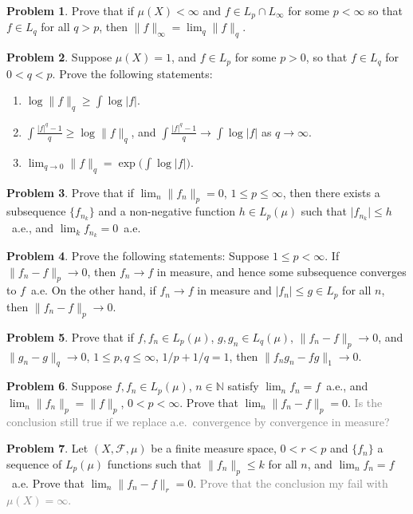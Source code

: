 \documentclass[12pt,reqno]{amsart}
\def\field#1{\mathbb{#1}}
\def\abs#1{\lvert {#1} \rvert}
\def\Lpnorm#1#2{\lVert {#1} \rVert_{#2}}
\theoremstyle{definition}
\newtheorem{problem}{Problem}
\theoremstyle{remark}
\begin{document}
\begin{problem}
  Prove that if $\mu(X) < \infty$ and $f \in L_p \cap L_\infty$ for
  some $p<\infty$ so that $f \in L_q$ for all $q>p$, then
  $\Lpnorm{f}{\infty} = \lim_q \Lpnorm{f}{q}$.
\end{problem}
\begin{problem}
  Suppose $\mu(X)=1$, and $f \in L_p$ for some $p>0$, so that $f \in
  L_q$ for $0<q<p$.  Prove the following statements:
  \begin{enumerate}
  \item $\log \Lpnorm{f}{q} \geq \int \log \abs{f}$.
  \item $\int \frac{\abs{f}^q - 1}{q} \geq \log \Lpnorm{f}{q}$, and
    $\int \frac{\abs{f}^q - 1}{q} \to \int \log \abs{f}$ as $q \to
    \infty$.
  \item $\lim_{q \to 0} \Lpnorm{f}{q} = \exp \big( \int \log \abs{f}
  \big)$.
  \end{enumerate}
\end{problem}

\begin{problem}
  Prove that if $\lim_n \Lpnorm{f_n}{p} = 0$, $1 \leq p \leq \infty$,
  then there exists a subsequence $\{ f_{n_k} \}$ and a non-negative
  function $h \in L_p(\mu)$ such that $\abs{f_{n_k}} \leq h$~a.e., and
  $\lim_k f_{n_k} = 0$~a.e.
\end{problem}
\begin{problem}
  Prove the following statements: Suppose $1 \leq p < \infty$.  If
  $\Lpnorm{f_n - f}{p} \to 0$, then $f_n \to f$ in measure, and hence
  some subsequence converges to $f$~a.e.  On the other hand, if $f_n
  \to f$ in measure and $\abs{f_n} \leq g \in L_p$ for all $n$, then
  $\Lpnorm{f_n - f}{p} \to 0$.
\end{problem}
\begin{problem}
  Prove that if $f, f_n \in L_p(\mu)$, $g,g_n \in L_q(\mu)$,
  $\Lpnorm{f_n - f}{p} \to 0$, and $\Lpnorm{g_n - g}{q} \to 0$, $1\leq
  p,q \leq \infty$, $1/p + 1/q =1$, then $\Lpnorm{f_n g_n - fg}{1} \to
  0$.
\end{problem}
\begin{problem}
  Suppose $f, f_n \in L_p(\mu)$, $n \in \field{N}$ satisfy $\lim_n f_n
  = f$~a.e., and $\lim_n \Lpnorm{f_n}{p} = \Lpnorm{f}{p}$,
  $0<p<\infty$.  Prove that $\lim_n \Lpnorm{f_n -f}{p} = 0$.
  \textcolor{gray}{Is the conclusion still true if we replace
    a.e.~convergence by convergence in measure?}
\end{problem}
\begin{problem}
  Let $(X,\mathcal{F}, \mu)$ be a finite measure space, $0<r<p$ and
  $\{ f_n \}$ a sequence of $L_p(\mu)$ functions such that
  $\Lpnorm{f_n}{p} \leq k$ for all $n$, and $\lim_n f_n = f$~a.e.
  Prove that $\lim_n \Lpnorm{f_n - f}{r} = 0$. \textcolor{gray}{Prove
    that the conclusion my fail with $\mu(X) = \infty$.}
\end{problem}
\end{document}
